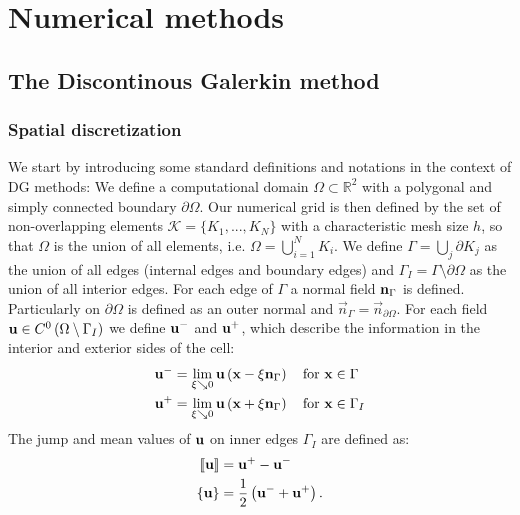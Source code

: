 \chapter{Numerical methods}	\label{ch:introduction}

\section{The Discontinous Galerkin method}
\subsection{Spatial discretization} \label{ssec:SpatDiscretization}
We start by introducing some standard definitions and notations in the context of DG methods:\cite{kummerExtendedDiscontinuousGalerkin2017} \cite{kikkerFullyCoupledHighorder}
We define a computational domain $\Omega \subset \mathbb{R}^2$ with a polygonal and simply connected boundary $\partial \Omega$. Our numerical grid is then defined by the set of non-overlapping elements $\mathcal{K} = \{K_1, ..., K_N\}$ with a characteristic mesh size $h$, so that $\Omega$ is the union of all elements, i.e. $\Omega = \bigcup_{i=1}^N K_i$. We define  $\Gamma = \bigcup_j \partial K_j$ as the union of all edges (internal edges and boundary edges) and $\Gamma_I = \Gamma \setminus \partial \Omega$ as the union of all interior edges. 
For each edge of $\Gamma$ a normal field $\textbf{n}_{\Gamma}$ is defined. Particularly on $\partial \Omega$ is defined as an outer normal and $\vec{n}_\Gamma = \vec{n}_{\partial\Omega}$.
For each field $\textbf{u} \in C^0\left(\Omega\setminus \Gamma_I\right)$ we define  $\textbf{u}^-$  and  $\textbf{u}^+$, which describe the information in the interior and exterior sides of the cell:
\begin{align} 
\textbf{u}^- &= \lim_{\xi \searrow 0} \textbf{u}\left(\textbf{x} - \xi \textbf{n}_{\Gamma}\right) \quad \text{for } \textbf{x}\in \Gamma\\
\textbf{u}^+ &= \lim_{\xi \searrow 0} \textbf{u}\left(\textbf{x} + \xi \textbf{n}_{\Gamma}\right) \quad \text{for } \textbf{x}\in \Gamma_I
\end{align}
The jump and mean values of $\textbf{u}$ on inner edges $\Gamma_I$ are defined as:
\begin{align}
\llbracket \textbf{u} \rrbracket &= \textbf{u}^+-\textbf{u}^- \\
\{\textbf{u}\} &= \frac{1}{2} \left(\textbf{u}^-+\textbf{u}^+\right).
\end{align}
